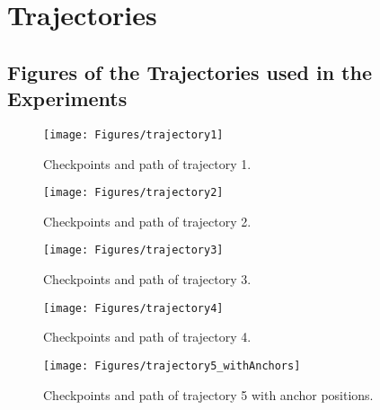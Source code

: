 
\chapter{Trajectories} %

\label{AppendixA} %

\section{Figures of the Trajectories used in the Experiments}

\begin{figure}[th]
\centering
\texttt{[image: Figures/trajectory1]}
\decoRule
\caption[Trajectory 1]{Checkpoints and path of trajectory 1.}
\label{fig:trajectory1Appendix}
\end{figure}

\begin{figure}[th]
\centering
\texttt{[image: Figures/trajectory2]}
\decoRule
\caption[Trajectory 2]{Checkpoints and path of trajectory 2.}
\label{fig:trajectory2}
\end{figure}


\begin{figure}[th]
\centering
\texttt{[image: Figures/trajectory3]}
\decoRule
\caption[Trajectory 3]{Checkpoints and path of trajectory 3.}
\label{fig:trajectory3}
\end{figure}


\begin{figure}[th]
\centering
\texttt{[image: Figures/trajectory4]}
\decoRule
\caption[Trajectory 4]{Checkpoints and path of trajectory 4.}
\label{fig:trajectory4}
\end{figure}

\begin{figure}[th]
\centering
\texttt{[image: Figures/trajectory5\_withAnchors]}
\decoRule
\caption[Trajectory 5]{Checkpoints and path of trajectory 5 with anchor positions.}
\label{fig:trajectory5_withAnchorsAppendix}
\end{figure}
